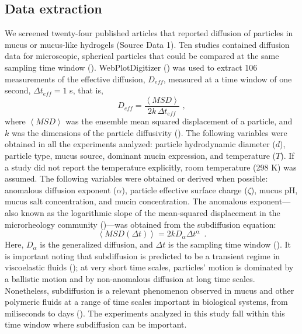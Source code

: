 \documentclass[aps,prl,preprint,superscriptaddress,showkeys,linenumbers]{revtex4-1}
\begin{document}
\subsection*{Data extraction}
We screened twenty-four published articles that reported diffusion of particles in mucus or mucus-like hydrogels (Source Data 1). Ten studies contained diffusion data for microscopic, spherical particles that could be compared at the same sampling time window (\cite{AbdulEurPharBioJ2015,BarrPNAS2015,LaiPNAS2007,LaiJVirol2009, LeilegBiophyscial2010,OlmstedBioJ2001,NewbyNatureCom2017,SchusterBiomaterial2013,SukNanomedicine2011,YildizDrugTarJ2015}). WebPlotDigitizer (\cite{webplotdigitizer}) was used to extract 106 measurements of the effective diffusion, $D_{eff}$, measured at a time window of one second, $\Delta t_{eff}= 1$ s, that is, 
\begin{equation}
D_{eff} =  \frac{\left\langle MSD \right\rangle}{2k \, \Delta t_{eff}} \,\,,
\label{eq:Deff_definition}
\end{equation}
where $\left\langle MSD \right\rangle$ was the ensemble mean squared displacement of a particle, and $k$ was the dimensions of the particle diffusivity (\cite{HuangMMB2013}). The following variables were obtained in all the experiments analyzed: particle hydrodynamic diameter ($d$), particle type, mucus source, dominant mucin expression, and temperature ($T$).
If a study did not report the temperature explicitly, room temperature (298 K) was assumed.  
The following variables were obtained or derived when possible: anomalous diffusion exponent ($\alpha$), particle effective surface charge ($\zeta$), mucus pH, mucus salt concentration, and mucin concentration. The anomalous exponent\textcolor{Antonio}{---also known as the logarithmic slope of the mean-squared displacement in the microrheology community (\cite{McGlynn2020JAP})---}was obtained from the  subdiffusion equation:
\begin{equation}
\left\langle MSD(\Delta t ) \right\rangle = 2k D_{\alpha} \Delta t^\upalpha \,\,\, .
\label{eq:anomalous_diff}
\end{equation}
Here, $D_{\alpha}$ is the generalized diffusion, and $\Delta t$ is the sampling time window (\cite{Barkai2012PhysToday,Metzler2014,Hou2018PCCP}). 
\textcolor{Antonio}{It is important noting that subdiffusion is predicted to be a transient regime in viscoelastic fluids (\cite{Grimm2011SoftMatter}); at very short time scales, particles' motion is dominated by a ballistic motion and by non-anomalous diffusion at long time scales. Nonetheless, subdiffusion is a relevant phenomenon observed in mucus and other polymeric fluids at a range of time scales important in biological systems, from miliseconds to days (\cite{Grebenkov2013PRE,ConeAdvDDM2009,Chew2014mBio}). The experiments analyzed in this study fall within this time window where subdiffusion can be important.}
\end{document}

